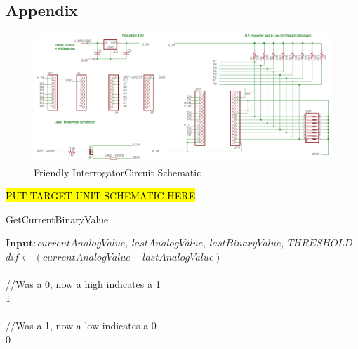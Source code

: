\documentclass[letterpaper,10pt]{article}
\begin{document}
\begin{spacing}{1.15}
\section*{Appendix}

\begin{figure} [H]
	\centering
	\includegraphics[scale=0.37]{friendly_interrogator_circuit.png}
	\caption{Friendly InterrogatorCircuit Schematic \label{fig:threshold}}
\end{figure}

\hl{PUT TARGET UNIT SCHEMATIC HERE}


\makeatletter
\def\BState{\State\hskip-\ALG@thistlm}
\makeatother

\begin{algorithm}[H]
	\caption{GetCurrentBinaryValue}\label{algo-1}
	\begin{algorithmic}[1]
		\State $\textbf{Input}: \textit{currentAnalogValue},\ \textit{lastAnalogValue},\ \textit{lastBinaryValue},\ \textit{THRESHOLD}$\\
		
		\State $\textit{dif} \gets (\textit{currentAnalogValue} - \textit{lastAnalogValue})$\\\\
		
		
		//Was a 0, now a high indicates a 1
		 \\
		\quad \Return $1$\\\\
		
		//Was a 1, now a low indicates a 0
		 \\
		\quad \Return $0$\\\\
		

\end{algorithmic}
\end{algorithm}
\end{spacing}
\end{document}
